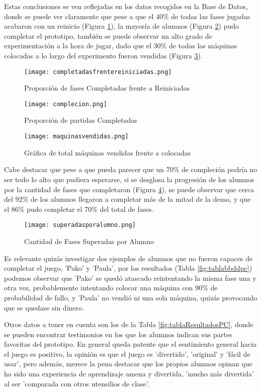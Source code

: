 Estas conclusiones se ven reflejadas en los datos recogidos en la Base de Datos, donde se puede ver claramente que pese a que el 40\% de todas las
 fases jugadas acabaron con un reinicio (Figura \ref{fig:fasesreiniciadas}), la mayoría de alumnos (Figura \ref{fig:fasescompletadas}) pudo completar el prototipo, 
 también se puede observar un alto grado de experimentación a la hora de jugar, dado que el 30\% de todas las máquinas colocadas a lo largo del experimento fueron vendidas (Figura \ref{fig:maquinasvendidas}). 

  \begin{figure}[H]
    \centering
      \texttt{[image: completadasfrentereiniciadas.png]}
    \caption{Proporción de fases Completadas frente a Reiniciadas}
    \label{fig:fasesreiniciadas}
  \end{figure}

  \begin{figure}[H]
    \centering
      \texttt{[image: complecion.png]}
    \caption{Proporción de partidas Completadas}
    \label{fig:fasescompletadas}
  \end{figure}

  \begin{figure}[H]
    \centering
      \texttt{[image: maquinasvendidas.png]}
    \caption{Gráfica de total máquinas vendidas frente a colocadas}
    \label{fig:maquinasvendidas}
  \end{figure}
  
  Cabe destacar que pese a que pueda parecer que un 70\% de compleción podría no ser todo lo alto que pudiera esperarse, si se desglosa la progresión de los alumnos por la cantidad de fases que completaron (Figura \ref{fig:fasescompl}), 
  se puede observar que cerca del 92\% de los alumnos llegaron a completar más de la mitad de la demo, y que el 86\% pudo completar el 70\% del total de fases.

    \begin{figure}[H]
      \centering
        \texttt{[image: superadasporalumno.png]}
      \caption{Cantidad de Fases Superadas por Alumno}
      \label{fig:fasescompl}
    \end{figure}

Es relevante quizás investigar dos ejemplos de alumnos que no fueron capaces de completar el juego, 'Pako' y 'Paula', por los resultados (Tabla \ref{fig:tablabbddpc}) podemos
 observar que 'Pako' se quedó atascado reintentando la misma fase una y otra vez, probablemente intentando colocar una máquina con 90\% de probabilidad
  de fallo, y 'Paula' no vendió ni una sola máquina, quizás provocando que se quedase sin dinero.

Otros datos a tener en cuenta son los de la Tabla \ref{fig:tablaResultadosPC}, donde se pueden encontrar testimonios en los que los alumnos indican 
sus partes favoritas del prototipo. En general queda patente que el sentimiento general hacia el juego es positivo, la opinión es que el juego es
 'divertido', 'original' y 'fácil de usar', pero además, merece la pena destacar que los propios alumnos opinan que ha sido una experiencia de 
 aprendizaje amena y divertida, 'mucho más divertida' al ser 'comparada con otros utensilios de clase'.